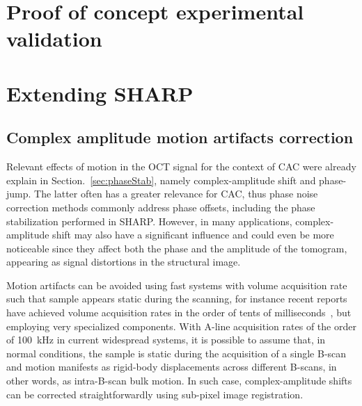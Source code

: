 \section{Proof of concept experimental validation}\label{sec:Test}

\section{Extending SHARP}\label{sec:Extensions}

\subsection{Complex amplitude motion artifacts correction}

Relevant effects of motion in the OCT signal for the context of CAC were already explain in Section.~\ref{sec:phaseStab}, namely complex-amplitude shift and phase-jump. The latter often has a greater relevance for CAC, thus phase noise correction methods commonly address phase offsets, including the phase stabilization performed in SHARP. However, in many  applications, complex-amplitude shift may also have a significant influence and could even be more noticeable since they affect both the phase and the amplitude of the tomogram, appearing as signal distortions in the structural image.

Motion artifacts can be avoided using fast systems with volume acquisition rate such that sample appears static during the scanning, for instance recent reports have achieved volume acquisition rates in the order of tents of milliseconds~\cite{Auksorius2020_vivo}, but employing very specialized components. With A-line acquisition rates of the order of 100~kHz in current widespread systems, it is possible to assume that, in normal conditions, the sample is static during the acquisition of a single B-scan and motion manifests as rigid-body displacements across different B-scans, in other words, as intra-B-scan bulk motion. In such case, complex-amplitude shifts can be corrected straightforwardly using sub-pixel image registration.

